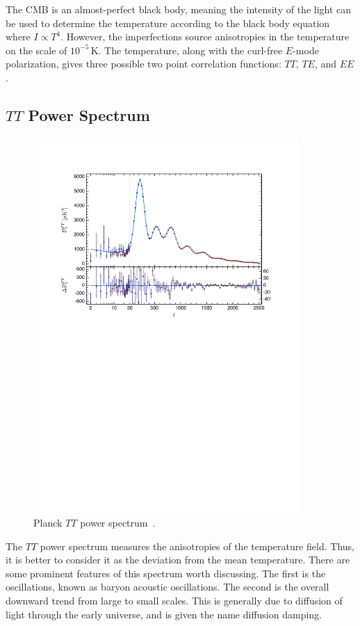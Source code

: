 The CMB is an almost-perfect black body, meaning the intensity of the light can be used to determine the temperature according to the black body equation where $I \propto T^4$. However, the imperfections source anisotropies in the temperature on the scale of $10^{-5}\,\mathrm{K}$. The temperature, along with the curl-free $E$-mode polarization, gives three possible two point correlation functions: $TT$, $TE$, and $EE$.
\subsection{\texorpdfstring{$TT$ Power Spectrum}{TT Power Spectrum}}
\begin{figure}
    \centering
    \includegraphics[width=0.9\textwidth]{plots/planck_tt.pdf}
    \caption{Planck $TT$ power spectrum~\cite{planck_collaboration_planck_2020}.}
    \label{fig:planck_tt}
\end{figure}
The $TT$ power spectrum measures the anisotropies of the temperature field. Thus, it is better to consider it as the deviation from the mean temperature. There are some prominent features of this spectrum worth discussing. The first is the oscillations, known as baryon acoustic oscillations. The second is the overall downward trend from large to small scales. This is generally due to diffusion of light through the early universe, and is given the name diffusion damping.


